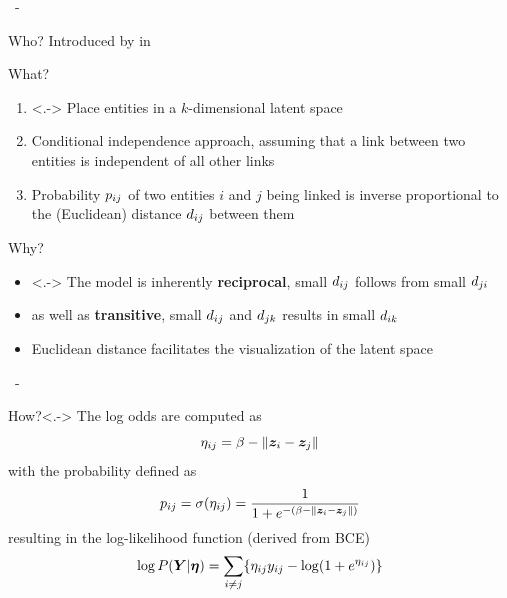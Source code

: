 \documentclass{beamer}
\newenvironment{xframe}
    {\begin{frame}{
        \ifx\insertsubsection\empty
            \strut
        \else\ifx\insertsubsubsection\empty
            \insertsection
        \else
            \insertsection~-~\insertsubsection
        \fi\fi
    }{
        \ifx\insertsubsection\empty
            \insertsection
        \else\ifx\insertsubsubsection\empty
            \insertsubsection
        \else
            \insertsubsubsection
        \fi\fi
    }}
    {\end{frame}}
\newenvironment{xblock}[1]
    {\begin{block}{#1}}
    {\end{block}}
\begin{document}
    \begin{xframe}
        \begin{xblock}{Who?}
            Introduced by \citeauthor{hoff2002latent} \cite{hoff2002latent} in \citeyear{hoff2002latent}
        \end{xblock}
        
        \begin{xblock}{What?}
            \begin{enumerate}
                \item<.-> Place entities in a $k$-dimensional latent space
                \item Conditional independence approach, assuming that a link between two entities is independent of all other links
                \item Probability $\sub(p)$ of two entities $i$ and $j$ being linked is inverse proportional to the (Euclidean) distance $\sub(d)$ between them
            \end{enumerate}
        \end{xblock}
        
        \begin{xblock}{Why?}
            \begin{itemize}
                \item<.-> The model is inherently \textbf{reciprocal}, small $\sub(d)$ follows from small $\sub(d)(ji)$
                \item as well as \textbf{transitive}, small $\sub(d)$ and $\sub(d)(jk)$ results in small $\sub(d)(ik)$
                \item Euclidean distance facilitates the visualization of the latent space
            \end{itemize}
        \end{xblock}
    \end{xframe}
    
    \begin{xframe}
        \begin{xblock}{How?}<.->
            The log odds are computed as 
            \[\sub(\eta) = \beta - \Vert\z_i-\z_j\Vert\]
            \pause
            with the probability defined as
            \[\sub(p) = \sigma(\sub(\eta)) = \frac{1}{1 + e^{-(\beta - \Vert\z_i-\z_j\Vert)}}\]
            \pause
            resulting in the log-likelihood function (derived from BCE)
            \[\log P(\Y|\bm{\eta}) = \sum_{i\neq j}\{ \sub(\eta)\sub(y) - \log(1+e^{\sub(\eta)}) \}\]
        \end{xblock}
    \end{xframe}
    
\end{document}
